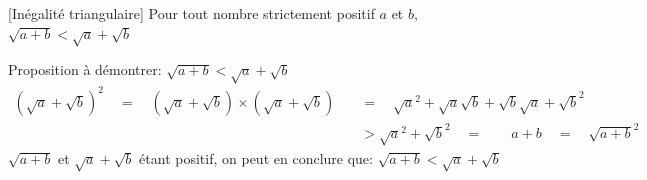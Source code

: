 \begin{prop}{}{}[Inégalité triangulaire]
Pour tout nombre strictement positif $a$ et $b$,  $\sqrt{a + b} < \sqrt{a} + \sqrt{b}$
\end{prop}

\begin{deme}{}{}
Proposition à démontrer: $\sqrt{a + b} < \sqrt{a} + \sqrt{b}$
\begin{align*}
\left( \sqrt{a} + \sqrt{b} \right) ^2 \quad = \quad \left( \sqrt{a} + \sqrt{b} \right) \times \left( \sqrt{a} + \sqrt{b} \right) \quad &= \quad \sqrt{a}^2 + \sqrt{a}\sqrt{b} + \sqrt{b}\sqrt{a} + \sqrt{b}^2 \\
&> \sqrt{a}^2 + \sqrt{b}^2 \quad = \quad \quad a+b \quad = \quad \sqrt{a+b} ^2 
\end{align*}
$\sqrt{a+b}$ et $\sqrt{a} + \sqrt{b}$ étant positif, on peut en conclure que:
$\sqrt{a + b} < \sqrt{a} + \sqrt{b}$
\end{deme}

\vspace{-3mm}
	